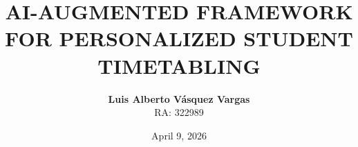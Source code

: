 
\title{AI-AUGMENTED FRAMEWORK FOR PERSONALIZED STUDENT TIMETABLING}
\author{
    \textbf{Luis Alberto Vásquez Vargas} \\
    \small RA: 322989 \\[0.8em]
    \small \textit{}
}
\date{April 9, 2026}

\newcommand{\mykeywords}{student timetabling, reinforcement learning, neural-guided heuristics, combinatorial optimization, search space pruning}
